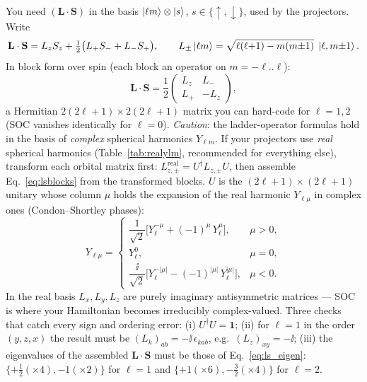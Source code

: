 You need $(\mathbf L\cdot\mathbf S)$ in the basis
$\ket{\ell m}\otimes\ket{s}$, $s\in\{\uparrow,\downarrow\}$, used by the
projectors. Write
\begin{equation}
\mathbf L \cdot \mathbf S
= L_z S_z + \tfrac12\big(L_+ S_- + L_- S_+\big),
\qquad
L_\pm \ket{\ell m} = \sqrt{\ell(\ell{+}1) - m(m{\pm}1)}\;\ket{\ell, m{\pm}1}.
\end{equation}
In block form over spin (each block an operator on $m = -\ell..\ell$):
\begin{equation}
\mathbf L\cdot\mathbf S =
\frac12
\begin{pmatrix}
L_z & L_- \\
L_+ & -L_z
\end{pmatrix},
\label{eq:lsblocks}
\end{equation}
a Hermitian $2(2\ell{+}1)\times 2(2\ell{+}1)$ matrix you can hard-code for
$\ell = 1, 2$ (SOC vanishes identically for $\ell = 0$). \emph{Caution}: the
ladder-operator formulas hold in the basis of \emph{complex} spherical
harmonics $Y_{\ell m}$. If your projectors use \emph{real} spherical
harmonics (Table~\ref{tab:realylm}, recommended for everything else),
transform each orbital matrix first: $L^{\mathrm{real}}_{z,\pm} =
U^\dagger L_{z,\pm} U$, then assemble Eq.~\eqref{eq:lsblocks} from the
transformed blocks. $U$ is the $(2\ell{+}1)\times(2\ell{+}1)$ unitary
whose column $\mu$ holds the expansion of the real harmonic $Y_{\ell\mu}$
in complex ones (Condon--Shortley phases):
\begin{equation}
Y_{\ell\mu} =
\begin{cases}
\dfrac{1}{\sqrt2}\Big[Y_{\ell}^{-\mu} + (-1)^{\mu}\, Y_{\ell}^{\mu}\Big],
 & \mu > 0,\\[8pt]
Y_{\ell}^{0}, & \mu = 0,\\[4pt]
\dfrac{\ii}{\sqrt2}\Big[Y_{\ell}^{-|\mu|} - (-1)^{|\mu|}\, Y_{\ell}^{|\mu|}\Big],
 & \mu < 0 .
\end{cases}
\label{eq:realtocomplex}
\end{equation}
In the real basis $L_x, L_y, L_z$ are purely imaginary antisymmetric
matrices --- SOC is where your Hamiltonian becomes irreducibly
complex-valued. Three checks that catch every sign and ordering error:
(i) $U^\dagger U = \mathbf 1$; (ii) for $\ell = 1$ in the order
$(y, z, x)$ the result must be $(L_k)_{ab} = -\ii\,\epsilon_{kab}$, e.g.\
$(L_z)_{xy} = -\ii$; (iii) the eigenvalues of the assembled
$\mathbf L\cdot\mathbf S$ must be those of Eq.~\eqref{eq:ls_eigen}:
$\{+\tfrac12 (\times4), -1 (\times 2)\}$ for $\ell=1$ and
$\{+1 (\times 6), -\tfrac32 (\times 4)\}$ for $\ell = 2$.

